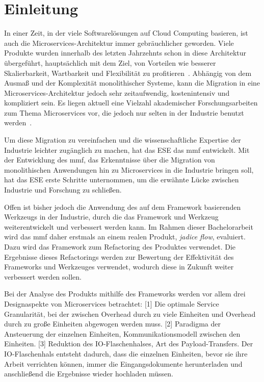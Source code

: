 \chapter{Einleitung}
\label{chap:einleitung}

In einer Zeit, in der viele Softwarelösungen auf Cloud Computing basieren, ist auch die Microservices-Architektur immer gebräuchlicher geworden.
Viele Produkte wurden innerhalb des letzten Jahrzehnts schon in diese Architektur übergeführt, hauptsächlich mit dem Ziel, von Vorteilen wie besserer Skalierbarkeit, Wartbarkeit und Flexibilität zu profitieren~\cite{Fritzsch_2019,taibi2017processmotivations}.
Abhängig von dem Ausmaß und der Komplexität monolithischer Systeme, kann die Migration in eine Microservices-Architektur jedoch sehr zeitaufwendig, kostenintensiv und kompliziert sein.
Es liegen aktuell eine Vielzahl akademischer Forschungsarbeiten zum Thema Microservices vor, die jedoch nur selten in der Industrie benutzt werden~\cite{fritzsch2022architecturecentric}.

Um diese Migration zu vereinfachen und die wissenschaftliche Expertise der Industrie leichter zugänglich zu machen, hat das ESE das \gls{mmf} entwickelt.
Mit der Entwicklung des \gls{mmf}, das Erkenntnisse über die Migration von monolithischen Anwendungen hin zu Microservices in die Industrie bringen soll, hat das ESE erste Schritte unternommen, um die erwähnte Lücke zwischen Industrie und Forschung zu schließen.

Offen ist bisher jedoch die Anwendung des auf dem Framework basierenden Werkzeugs in der Industrie, durch die das Framework und Werkzeug weiterentwickelt und verbessert werden kann.
Im Rahmen dieser Bachelorarbeit wird das \acrshort{mmf} daher erstmals an einem realen Produkt, \emph{jadice flow}, evaluiert.
Dazu wird das Framework zum Refactoring des Produktes verwendet.
Die Ergebnisse dieses Refactorings werden zur Bewertung der Effektivität des Frameworks und Werkzeuges verwendet, wodurch diese in Zukunft weiter verbessert werden sollen.

Bei der Analyse des Produkts mithilfe des Frameworks werden vor allem drei Designaspekte von Microservices betrachtet:
[1] Die optimale Service Granularität, bei der zwischen Overhead durch zu viele Einheiten und Overhead durch zu große Einheiten abgewogen werden muss.
[2] Paradigma der Ansteuerung der einzelnen Einheiten, Kommunikationsmodell zwischen den Einheiten.
[3] Reduktion des IO-Flaschenhalses, Art des Payload-Transfers.
Der IO-Flaschenhals entsteht dadurch, dass die einzelnen Einheiten, bevor sie ihre Arbeit verrichten können, immer die Eingangsdokumente herunterladen und anschließend die Ergebnisse wieder hochladen müssen.

